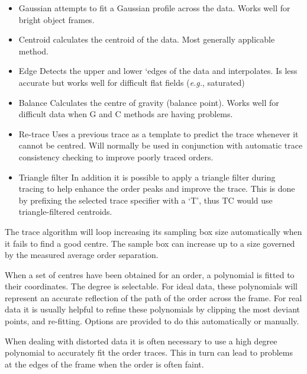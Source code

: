 \documentclass[twoside,11pt]{article}
\renewcommand{\_}{\texttt{\symbol{95}}}
\newcommand{\myindex}[1]{\index{#1}}
\newcommand{\myindex}[1]{}
\begin{document}
\begin{itemize}

\item{Gaussian} attempts to fit a Gaussian profile across the data.
Works well for bright object frames.

\item{Centroid} calculates the centroid of the data. Most generally
applicable method.

\item{Edge} Detects the upper and lower `edges of the data and
interpolates. Is less accurate but works well for difficult flat fields
({\it{e.g.}}, saturated)

\item{Balance} Calculates the centre of gravity (balance point). Works
well for difficult data when G and C methods are having problems.

\item{Re-trace} Uses a previous trace as a template to predict the trace
whenever it cannot be centred. Will normally be used in conjunction with
automatic trace consistency checking to improve poorly traced orders.

\item{Triangle filter} In addition it is possible to apply a
triangle filter during tracing to help enhance the order peaks and
improve the trace. This is done by prefixing the selected trace
specifier with a `T', thus TC would use triangle-filtered
centroids.

\myindex{Manually set order path}
\end{itemize}

The trace algorithm will loop increasing its sampling box size
automatically when it fails to find a good centre. The sample box can
increase up to a size governed by the measured average order separation.

When a set of centres have been obtained for an order, a polynomial is
fitted to their coordinates. The degree is selectable.
For ideal data, these polynomials will represent an accurate reflection
of the path of the order across the frame. For real data it is usually
helpful to refine these polynomials by clipping the most deviant points,
and re-fitting.  Options are provided to do this automatically or
manually.

When dealing with distorted data it is often necessary to use a high
degree polynomial to accurately fit the order traces. This in turn can
lead to problems at the edges of the frame when the order is often
faint.
\end{document}
